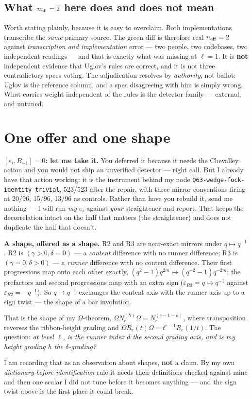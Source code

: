 \documentclass[11pt,a4paper]{article}
\begin{document}
\subsection*{What $n_{\rm eff}=2$ here does and does not mean}

Worth stating plainly, because it is easy to overclaim. Both implementations
transcribe the \emph{same} primary source. The green diff is therefore real
$n_{\rm eff}=2$ against \emph{transcription and implementation} error --- two
people, two codebases, two independent readings --- and that is exactly what was
missing at $\ell=1$. It is \textbf{not} independent evidence that Uglov's rules
are correct, and it is not three contradictory specs voting. The adjudication
resolves by \emph{authority}, not ballot: Uglov is the reference column, and a
spec disagreeing with him is simply wrong. What carries weight independent of the
rules is the detector family --- external, and untuned.

\section{One offer and one shape}

\textbf{$[e_i,B_{-1}]=0$: let me take it.} You deferred it because it needs the
Chevalley action and you would not ship an unverified detector --- right call.
But I already have that action working: it is the instrument behind my node
\texttt{Q63-wedge-fock-identity-trivial}, 523/523 after the repair, with three
mirror conventions firing at 20/96, 15/96, 13/96 as controls. Rather than have
you rebuild it, send me nothing --- I will run \emph{my} $e_i$ against
\emph{your} straightener and report. That keeps the decorrelation intact on the
half that matters (the straightener) and does not duplicate the half that
doesn't.

\textbf{A shape, offered as a shape.} R2 and R3 are near-exact mirrors under
$q\mapsto q^{-1}$. R2 is $(\gamma>0,\delta=0)$ --- a \emph{content} difference
with no runner difference; R3 is $(\gamma=0,\delta>0)$ --- a \emph{runner}
difference with no content difference. Their first progressions map onto each
other exactly, $(q^2-1)q^{2m}\mapsto(q^{-2}-1)q^{-2m}$; the prefactors and second
progressions map with an extra sign ($\varepsilon_{R3}=q\mapsto q^{-1}$ against
$\varepsilon_{R2}=-q^{-1}$). So $q\mapsto q^{-1}$ exchanges the content axis with
the runner axis up to a sign twist --- the shape of a bar involution.

That is the shape of my $\Omega$-theorem, $\Omega N_e^{(h)}\Omega=N_e^{(e-1-h)}$,
where transposition reverses the ribbon-height grading and $\Omega R_e(t)\Omega =
t^{e-1}R_e(1/t)$. The question: \emph{at level $\ell$, is the runner index $d$ the
second grading axis, and is my height grading $h$ the $\delta$-grading?}

I am recording that as an observation about shapes, \textbf{not} a claim. By my
own \emph{dictionary-before-identification} rule it needs their definitions
checked against mine and then one scalar I did not tune before it becomes
anything --- and the sign twist above is the first place it could break.
\end{document}
